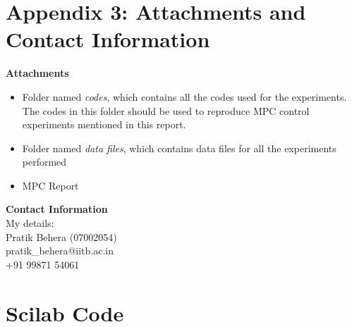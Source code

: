 \section{Appendix 3: Attachments and Contact Information}
\textbf{Attachments}
\begin{itemize}
\item Folder named \emph{codes}, which contains all the codes used for the experiments. The codes in this folder should be used to reproduce MPC control experiments mentioned in this report.
\item Folder named \emph{data files}, which contains data files for all the experiments performed
\item MPC Report
\end{itemize}
\textbf{Contact Information} \\
My details: \\
Pratik Behera (07002054) \\
pratik\_behera@iitb.ac.in \\
+91 99871 54061

\section{Scilab Code}\label{mpccode}


\begin{code}

\end{code}

\begin{code}

\end{code}

\begin{code}

\end{code}

